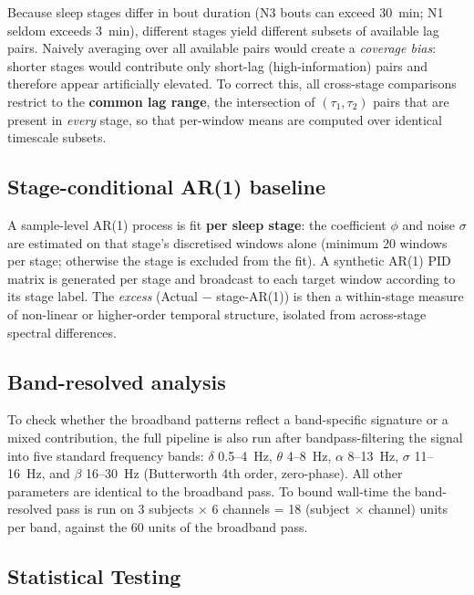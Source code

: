 \documentclass[11pt,a4paper]{article}
\begin{document}
Because sleep stages differ in bout duration (N3 bouts can exceed 30~min;
N1 seldom exceeds 3~min), different stages yield different subsets of
available lag pairs.  Naively averaging over all available pairs would
create a \emph{coverage bias}: shorter stages would contribute only
short-lag (high-information) pairs and therefore appear artificially
elevated.  To correct this, all cross-stage comparisons restrict to the
\textbf{common lag range}, the intersection of $(\tau_1, \tau_2)$ pairs
that are present in \emph{every} stage, so that per-window means are
computed over identical timescale subsets.

\subsection{Stage-conditional AR(1) baseline}
\label{sec:methods:ar1}

A sample-level AR(1) process is fit \textbf{per sleep stage}: the
coefficient $\phi$ and noise $\sigma$ are estimated on that stage's
discretised windows alone (minimum 20 windows per stage; otherwise the
stage is excluded from the fit).  A synthetic AR(1) PID matrix is generated
per stage and broadcast to each target window according to its stage label.
The \emph{excess} (Actual $-$ stage-AR(1)) is then a within-stage measure
of non-linear or higher-order temporal structure, isolated from across-stage
spectral differences.

\subsection{Band-resolved analysis}
\label{sec:methods:bands}

To check whether the broadband patterns reflect a band-specific signature
or a mixed contribution, the full pipeline is also run after
bandpass-filtering the signal into five standard frequency bands:
$\delta$ 0.5--4~Hz, $\theta$ 4--8~Hz, $\alpha$ 8--13~Hz, $\sigma$ 11--16~Hz,
and $\beta$ 16--30~Hz (Butterworth 4th order, zero-phase).  All other
parameters are identical to the broadband pass.  To bound wall-time the
band-resolved pass is run on 3 subjects $\times$ 6 channels = 18
(subject $\times$ channel) units per band, against the 60 units of the
broadband pass.

\subsection{Statistical Testing}
\end{document}
